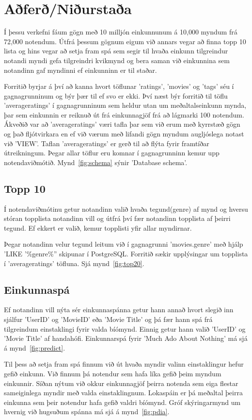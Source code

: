 \documentclass[11pt,a4paper]{amsart}
\theoremstyle{plain}
\theoremstyle{definition}
\theoremstyle{remark}
\begin{document}


\section{Aðferð/Niðurstaða}
Í þessu verkefni fáum gögn með 10 milljón einkunnunum á 10,000 myndum frá 72,000 notendum.
Útfrá þessum gögnum eigum við annars vegar að finna topp 10 lista og hins vegar að setja fram spá sem segir til hvaða einkunn tilgreindur notandi myndi gefa tilgreindri kvikmynd og bera saman við einkunnina sem notandinn gaf myndinni ef einkunninn er til staðar.  
\\\par
Forritið byrjar á því að kanna hvort töflunar 'ratings', 'movies' og 'tags' séu í gagnagrunninum og býr þær til ef svo er ekki. Því næst býr forritið til töflu 'averageratings' í gagnagrunninum sem heldur utan um meðaltalseinkunn mynda, þar sem einkunnin er reiknuð út frá einkunnagjöf frá að lágmarki 100 notendum. Ákveðið var að 'averageratings' væri tafla þar sem við erum með kyrrstæð gögn og það fljótvirkara en ef við værum með lifandi gögn myndum augljóslega notast við 'VIEW'. Taflan 'averageratings' er gerð til að flýta fyrir framtíðar útreikningum. Þegar allar töflur eru komnar í gagnagrunninn kemur upp notendaviðmótið. Mynd~\ref{fig:schema} sýnir 'Database schema'.

\subsection{Topp 10}
Í notendaviðmótinu getur notandinn valið hvaða tegund(genre) af mynd og hversu stóran topplista notandinn vill og útfrá því fær notandinn topplista af þeirri tegund. Ef ekkert er valið, kemur topplisti yfir allar myndirnar.\par Þegar notandinn velur tegund leitum við í gagnagrunni 'movies.genre' með hjálp 'LIKE '\%genre\%'' skipunar í PostgreSQL. Forritið sækir upplýsingar um topplista í 'averageratings' töfluna. Sjá mynd~\ref{fig:top20}.

\subsection{Einkunnaspá}
Ef notandinn vill nýta sér einkunnaspánna getur hann annað hvort slegið inn sjálfur 'UserID' og 'MovieID' eða 'Movie Title' og þá fær hann spá frá tilgreindum einstaklingi fyrir valda bíómynd. Einnig getur hann valið 'UserID' og 'Movie Title' af handahófi. Einkunnarspá fyrir 'Much Ado About Nothing' má sjá á mynd~\ref{fig:predict}.\par
Til þess að setja fram spá finnum við út hvaða myndir valinn einstaklingur hefur gefið einkunn. Við finnum þá notendur sem hafa líka gefið þeim myndum einkunnir. Síðan nýtum við okkur einkunnagjöf þeirra notenda sem eiga flestar sameiginlega myndir með valda einstaklingnum. Lokaspáin er þá meðaltal þeirra einkunna sem þeir notendur hafa gefið valdri bíómynd. Gróf skýringarmynd um hvernig við hugsuðum spánna má sjá á mynd~\ref{fig:pdia}.
\end{document}
